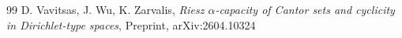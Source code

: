 \documentclass[a4paper,12pt]{amsart}
\theoremstyle{definition}
\begin{document}
\begin{thebibliography}{99}
D. Vavitsas, J. Wu, K. Zarvalis, \textit{Riesz $\alpha$-capacity of Cantor sets and cyclicity in Dirichlet-type spaces}, Preprint, arXiv:2604.10324 




\end{thebibliography}





		
\end{document}
